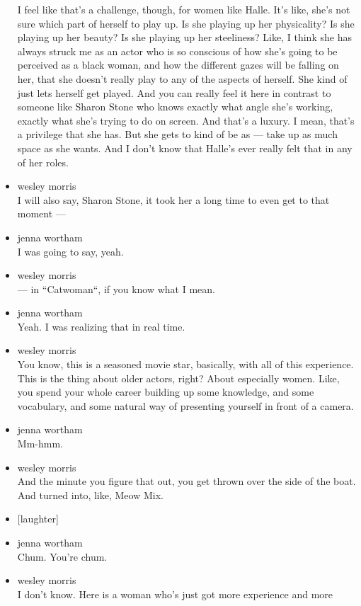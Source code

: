 \begin{itemize}
  I feel like that's a challenge, though, for women like Halle. It's
  like, she's not sure which part of herself to play up. Is she playing
  up her physicality? Is she playing up her beauty? Is she playing up
  her steeliness? Like, I think she has always struck me as an actor who
  is so conscious of how she's going to be perceived as a black woman,
  and how the different gazes will be falling on her, that she doesn't
  really play to any of the aspects of herself. She kind of just lets
  herself get played. And you can really feel it here in contrast to
  someone like Sharon Stone who knows exactly what angle she's working,
  exactly what she's trying to do on screen. And that's a luxury. I
  mean, that's a privilege that she has. But she gets to kind of be as
  --- take up as much space as she wants. And I don't know that Halle's
  ever really felt that in any of her roles.
\item
  wesley morris\\
  I will also say, Sharon Stone, it took her a long time to even get to
  that moment ---
\item
  jenna wortham\\
  I was going to say, yeah.
\item
  wesley morris\\
  --- in ``Catwoman``, if you know what I mean.
\item
  jenna wortham\\
  Yeah. I was realizing that in real time.
\item
  wesley morris\\
  You know, this is a seasoned movie star, basically, with all of this
  experience. This is the thing about older actors, right? About
  especially women. Like, you spend your whole career building up some
  knowledge, and some vocabulary, and some natural way of presenting
  yourself in front of a camera.
\item
  jenna wortham\\
  Mm-hmm.
\item
  wesley morris\\
  And the minute you figure that out, you get thrown over the side of
  the boat. And turned into, like, Meow Mix.
\item
  {[}laughter{]}
\item
  jenna wortham\\
  Chum. You're chum.
\item
  wesley morris\\
  I don't know. Here is a woman who's just got more experience and more

\end{itemize}
